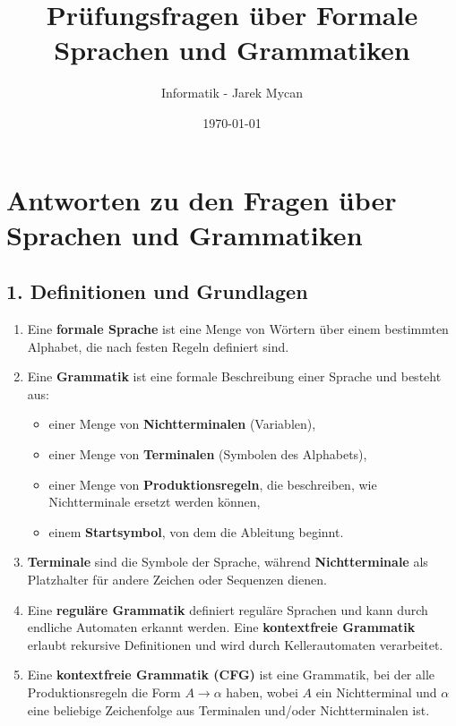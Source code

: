 \documentclass[a4paper,12pt]{article}
\begin{document}
	
	\title{Prüfungsfragen über Formale Sprachen und Grammatiken}
	\author{Informatik - Jarek Mycan}
	\date{\today}
	\maketitle
	
	\section*{Antworten zu den Fragen über Sprachen und Grammatiken}
	
	\subsection*{1. Definitionen und Grundlagen}
	\begin{enumerate}
		\item Eine \textbf{formale Sprache} ist eine Menge von Wörtern über einem bestimmten Alphabet, die nach festen Regeln definiert sind.
		
		\item Eine \textbf{Grammatik} ist eine formale Beschreibung einer Sprache und besteht aus:
		\begin{itemize}
			\item einer Menge von \textbf{Nichtterminalen} (Variablen),
			\item einer Menge von \textbf{Terminalen} (Symbolen des Alphabets),
			\item einer Menge von \textbf{Produktionsregeln}, die beschreiben, wie Nichtterminale ersetzt werden können,
			\item einem \textbf{Startsymbol}, von dem die Ableitung beginnt.
		\end{itemize}
		
		\item \textbf{Terminale} sind die Symbole der Sprache, während \textbf{Nichtterminale} als Platzhalter für andere Zeichen oder Sequenzen dienen.
		
		\item Eine \textbf{reguläre Grammatik} definiert reguläre Sprachen und kann durch endliche Automaten erkannt werden. Eine \textbf{kontextfreie Grammatik} erlaubt rekursive Definitionen und wird durch Kellerautomaten verarbeitet.
		
		\item Eine \textbf{kontextfreie Grammatik (CFG)} ist eine Grammatik, bei der alle Produktionsregeln die Form $A \rightarrow \alpha$ haben, wobei $A$ ein Nichtterminal und $\alpha$ eine beliebige Zeichenfolge aus Terminalen und/oder Nichtterminalen ist.
		

\end{enumerate}
\end{document}
